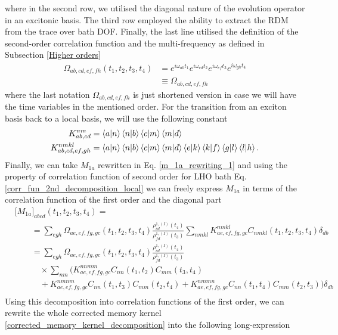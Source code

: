 where in the second row, we utilised the diagonal nature of the evolution operator in an excitonic basis. The third row employed the ability to extract the RDM from the trace over bath DOF. Finally, the last line utilised the definition of the second-order correlation function and the multi-frequency as defined in Subsection \ref{Higher orders} 
\begin{equation}
    \begin{aligned}
    \Omega_{ab,cd,ef,fh}(t_1, t_2,t_3,t_4) &= e^{i \omega_{ab}t_1} e^{i \omega_{cd}t_2} e^{i \omega_{ef}t_3} e^{i \omega_{gh}t_4} \\
    & \equiv \Omega_{ab,cd,ef,fh}
    \end{aligned}
\end{equation}
where the last notation $\Omega_{ab,cd,ef,fh}$ is just shortened version in case we will have the time variables in the mentioned order. For the transition from an exciton basis back to a local basis, we will use the following constant
\begin{equation}
    \begin{aligned}
    K_{ab,cd}^{nm} &= \braket{a}{n}\braket{n}{b}\braket{c}{m}\braket{m}{d} \\
    K_{ab,cd,ef,gh}^{nmkl} &= \braket{a}{n}\braket{n}{b}\braket{c}{m}\braket{m}{d} \braket{e}{k}\braket{k}{f} \braket{g}{l}\braket{l}{h}. \\
    \end{aligned}
\end{equation}
Finally, we can take $M_{1a}$ rewritten in Eq. \ref{m_1a_rewriting_1} and using the property of correlation function of second order for LHO bath Eq. \ref{corr_fun_2nd_decomposition_local} we can freely express $M_{1a}$ in terms of the correlation function of the first order and the diagonal part
\begin{equation}
\label{m_1a_rewriting_1}
    \begin{aligned}
    &\big[M_{1a}\big]_{abcd}(t_1, t_2, t_3, t_4)  = \\
    & \quad\quad =\sum_{egh} \Omega_{ae,ef,fg,gc}(t_1,t_2,t_3,t_4)\frac{\rho^{1, (I)}_{cd}(t_4)}{ \rho^{1, (I)}_{fd}(t_3)} \sum_{nmkl}K_{ae,ef,fg,gc}^{nmkl}C_{nmkl}(t_1, t_2, t_3, t_4) \delta_{db}\\
    &\quad\quad =\sum_{egh} \Omega_{ae,ef,fg,gc}(t_1,t_2,t_3,t_4)\frac{\rho^{1, (I)}_{cd}(t_4)}{ \rho^{1, (I)}_{fd}(t_3)}  \\
    &\quad\quad  \quad \times \sum_{nm} \big(K_{ae,ef,fg,gc}^{nnmm} C_{nn}(t_1, t_2)C_{mm} (t_3, t_4) \\
    &\quad\quad  \quad + K_{ae,ef,fg,gc}^{nmnm} C_{nn}(t_1, t_3)C_{mm}(t_2, t_4) + K_{ae,ef,fg,gc}^{nmmn} C_{nn}(t_1, t_4)C_{mm}(t_2, t_3) \big) \delta_{db}\\
    \end{aligned} 
\end{equation}
Using this decomposition into correlation functions of the first order, we can rewrite the whole corrected memory kernel \ref{corrected_memory_kernel_decomposition} into the following long-expression

